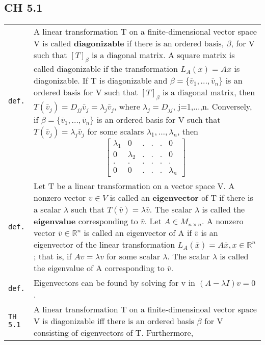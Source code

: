 \documentclass[10pt,landscape]{article}
\begin{document}
\begin{multicols}{3}
\section{CH 5.1}
\begin{tabular}{@{}p{\the\MyLen}%
                @{}p{\linewidth-\the\MyLen}@{}} %
\verb!def.! & A linear transformation T on a finite-dimensional vector space V is called \textbf{diagonizable} if there is an ordered basis, $\beta$, for V such that $[T]_\beta$ is a 
             diagonal matrix. A square matrix is called diagonizable if the transformation $L_A(\bar{x}) = A\bar{x}$ is diagonizable. If T is diagonizable and $\beta = \{\bar{v}_1, ...,
             \bar{v}_n\}$ is an ordered basis for V such that $[T]_\beta$ is a diagonal matrix, then $T(\bar{v}_j) = D_{jj}\bar{v}_j = \lambda_j\bar{v}_j$, where $\lambda_j = D_{jj}$,
             j=1,...,n. Conversely, if $\beta = \{\bar{v}_1,...,\bar{v}_n\}$ is an ordered basis for V such that $T(\bar{v}_j) = \lambda_j\bar{v}_j$ for some scalars $\lambda_1 ,...,
             \lambda_n$, then 
             \begin{equation*}
               \begin{bmatrix} \lambda_1 & 0 & . & . & . & 0 \\ 0 & \lambda_2 & . &. & . & 0 \\ . & . & . & . & . & . \\ 0 & 0 & . & . & . & \lambda_n \end{bmatrix}
             \end{equation*}\\
\verb!def.! & Let T be a linear transformation on a vector space V. A nonzero vector $v\in V$ is called an \textbf{eigenvector} of T if there is a scalar $\lambda$ such that $T(\bar{v}) =
             \lambda\bar{v}$. The scalar $\lambda$ is called the \textbf{eigenvalue} corresponding to $\bar{v}$. Let $A\in M_{n\!\times\! n}$. A nonzero vector $\bar{v}\in\mathbb{R}^n$ is
             called an eigenvector of A if $\bar{v}$ is an eigenvector of the linear transformation $L_A(\bar{x}) = A\bar{x}, x\in\mathbb{R}^n$; that is, if $Av = \lambda v$ for some 
             scalar $\lambda$. The scalar $\lambda$ is called the eigenvalue of A corresponding to $\bar{v}$. \\
\verb!def.! & Eigenvectors can be found by solving for v in $(A - \lambda I)v = 0$.\\
\verb!TH 5.1! & A linear transformation T on a finite-dimensinoal vector space V is diagonizable iff there is an ordered basis $\beta$ for V consisting of eigenvectors of T. Furthermore,

\end{tabular}
\end{multicols}
\end{document}

